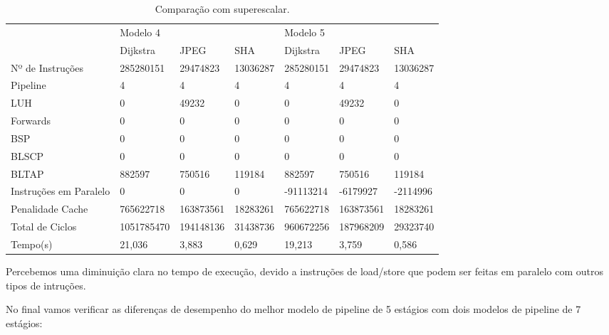 \documentclass[pdftex,12pt,a4paper]{article}
\begin{document}
\begin{table}[h]
\resizebox{17cm}{!} {
\begin{tabular}{l|lll|lll|}
                       & Modelo 4   &           &          & Modelo 5  &           &          \\
                       & Dijkstra   & JPEG      & SHA      & Dijkstra  & JPEG      & SHA      \\ \hline
Nº de Instruções       & 285280151  & 29474823  & 13036287 & 285280151 & 29474823  & 13036287 \\
Pipeline               & 4          & 4         & 4        & 4         & 4         & 4        \\
LUH                    & 0          & 49232     & 0        & 0         & 49232     & 0        \\
Forwards               & 0          & 0         & 0        & 0         & 0         & 0        \\
BSP                    & 0          & 0         & 0        & 0         & 0         & 0        \\
BLSCP                  & 0          & 0         & 0        & 0         & 0         & 0        \\
BLTAP                  & 882597     & 750516    & 119184   & 882597    & 750516    & 119184   \\
Instruções em Paralelo & 0          & 0         & 0        & -91113214 & -6179927  & -2114996 \\
Penalidade Cache       & 765622718  & 163873561 & 18283261 & 765622718 & 163873561 & 18283261 \\ \hline \hline
Total de Ciclos        & 1051785470 & 194148136 & 31438736 & 960672256 & 187968209 & 29323740 \\
Tempo(s)               & 21,036     & 3,883     & 0,629    & 19,213    & 3,759     & 0,586    \\ \hline
\end{tabular}
}
\caption{Comparação com superescalar.}
\label{tab4}
\end{table}

Percebemos uma diminuição clara no tempo de execução, devido a instruções de load/store 
que podem ser feitas em paralelo com outros tipos de intruções.

No final vamos verificar as diferenças de desempenho do melhor modelo de pipeline de 5 
estágios com dois modelos de pipeline de 7 estágios:
\end{document}
